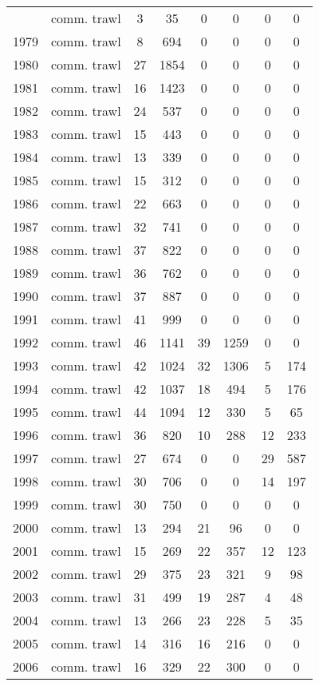 \begin{longtable}[t]{c>{\centering\arraybackslash}p{2cm}cccccc}
\endfoot
\bottomrule
\endlastfoot
1978 & comm. trawl & 3 & 35 & 0 & 0 & 0 & 0\\
1979 & comm. trawl & 8 & 694 & 0 & 0 & 0 & 0\\
1980 & comm. trawl & 27 & 1854 & 0 & 0 & 0 & 0\\
1981 & comm. trawl & 16 & 1423 & 0 & 0 & 0 & 0\\
1982 & comm. trawl & 24 & 537 & 0 & 0 & 0 & 0\\
1983 & comm. trawl & 15 & 443 & 0 & 0 & 0 & 0\\
1984 & comm. trawl & 13 & 339 & 0 & 0 & 0 & 0\\
1985 & comm. trawl & 15 & 312 & 0 & 0 & 0 & 0\\
1986 & comm. trawl & 22 & 663 & 0 & 0 & 0 & 0\\
1987 & comm. trawl & 32 & 741 & 0 & 0 & 0 & 0\\
1988 & comm. trawl & 37 & 822 & 0 & 0 & 0 & 0\\
1989 & comm. trawl & 36 & 762 & 0 & 0 & 0 & 0\\
1990 & comm. trawl & 37 & 887 & 0 & 0 & 0 & 0\\
1991 & comm. trawl & 41 & 999 & 0 & 0 & 0 & 0\\
1992 & comm. trawl & 46 & 1141 & 39 & 1259 & 0 & 0\\
1993 & comm. trawl & 42 & 1024 & 32 & 1306 & 5 & 174\\
1994 & comm. trawl & 42 & 1037 & 18 & 494 & 5 & 176\\
1995 & comm. trawl & 44 & 1094 & 12 & 330 & 5 & 65\\
1996 & comm. trawl & 36 & 820 & 10 & 288 & 12 & 233\\
1997 & comm. trawl & 27 & 674 & 0 & 0 & 29 & 587\\
1998 & comm. trawl & 30 & 706 & 0 & 0 & 14 & 197\\
1999 & comm. trawl & 30 & 750 & 0 & 0 & 0 & 0\\
2000 & comm. trawl & 13 & 294 & 21 & 96 & 0 & 0\\
2001 & comm. trawl & 15 & 269 & 22 & 357 & 12 & 123\\
2002 & comm. trawl & 29 & 375 & 23 & 321 & 9 & 98\\
2003 & comm. trawl & 31 & 499 & 19 & 287 & 4 & 48\\
2004 & comm. trawl & 13 & 266 & 23 & 228 & 5 & 35\\
2005 & comm. trawl & 14 & 316 & 16 & 216 & 0 & 0\\
2006 & comm. trawl & 16 & 329 & 22 & 300 & 0 & 0\\

\end{longtable}
